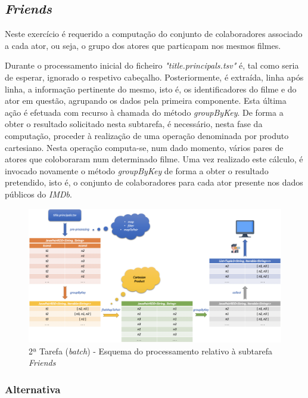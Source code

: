 \documentclass[a4paper]{report}
\begin{document}
{	\subsection{\textit{Friends}} \label{subsec:Task2-Friends}
		Neste exercício é requerido a computação do conjunto de colaboradores associado a cada ator, ou seja, o grupo dos atores que particapam nos mesmos filmes.
			
		Durante o processamento inicial do ficheiro \textsl{"title.principals.tsv"} é, tal como seria de esperar, ignorado o respetivo cabeçalho.
		Posteriormente, é extraída, linha após linha, a informação pertinente do mesmo, isto é, os identificadores do filme e do ator em questão, agrupando os dados pela primeira componente. Esta última ação é efetuada com recurso à chamada do método \textit{groupByKey}.
		De forma a obter o resultado solicitado nesta subtarefa, é necessário, nesta fase da computação, proceder à realização de uma operação denominada por produto cartesiano. Nesta operação computa-se, num dado momento, vários pares de atores que coloboraram num determinado filme.
		Uma vez realizado este cálculo, é invocado novamente o método \textit{groupByKey} de forma a obter o resultado pretendido, isto é, o conjunto de colaboradores para cada ator presente nos dados públicos do \textit{IMDb}.

		\begin{figure}[H]
            \centering
            \includegraphics[width=1.0\textwidth]{Imagens/2ª Tarefa - Friends.png}
            \caption{2ª Tarefa (\textit{batch}) - Esquema do processamento relativo à subtarefa \textit{Friends}}
            \label{fig:2}
        \end{figure}

		\subsubsection{Alternativa} \label{sssec:Task2-Friends-Alternativa}

}
\end{document}
